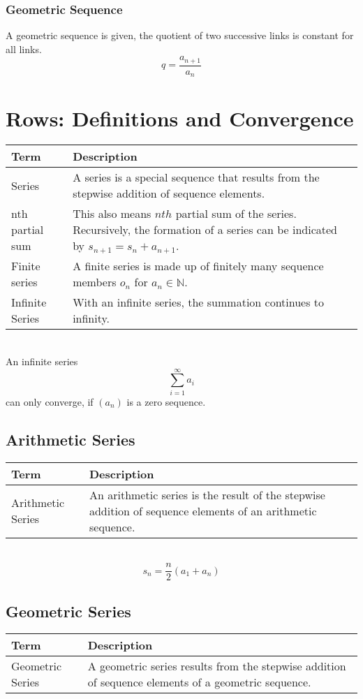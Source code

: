 \documentclass{book}
\begin{document}
\subsubsection{Geometric Sequence}
A geometric sequence is given, the quotient of two successive links is constant for all links.
\[
  q = \frac{a_{n+1}}{a_{n}}
\]


\section{Rows: Definitions and Convergence}

\begin{tabular}{p{3cm}p{10.5cm}}
  \toprule
  \textbf{Term} & \textbf{Description} \\
  \midrule
  Series    & A series is a special sequence that results from the stepwise addition of sequence elements.\\
  \midrule
  nth partial sum & This also means $nth$ partial sum of the series. Recursively, the formation of a series can be indicated by $s_{n+1} = s_{n} + a_{n+1}$.\\
  \midrule
  Finite series & A finite series is made up of finitely many sequence members $o_{n}$ for $a_{n}\in\mathbb{N}$.\\
  \midrule
  Infinite Series & With an infinite series, the summation continues to infinity.\\
  \bottomrule
\end{tabular}\\

An infinite series
\[
  \sum_{i=1}^{\infty} a_{i}
\]
can only converge, if $(a_{n})$ is a zero sequence.

\subsection{Arithmetic Series}
\begin{tabular}{p{3cm}p{10.5cm}}
  \toprule
  \textbf{Term} & \textbf{Description} \\
  \midrule
  Arithmetic Series & An arithmetic series is the result of the stepwise addition of sequence elements of an arithmetic sequence.\\
  \bottomrule
\end{tabular}\\

\[
  s_{n} = \frac{n}{2}\left(a_{1}+a_{n}\right)
\]

\subsection{Geometric Series}
\begin{tabular}{p{3cm}p{10.5cm}}
  \toprule
  \textbf{Term} & \textbf{Description} \\
  \midrule
  Geometric Series & A geometric series results from the stepwise addition of sequence elements of a geometric sequence.\\
  \bottomrule
\end{tabular}\\
\end{document}
